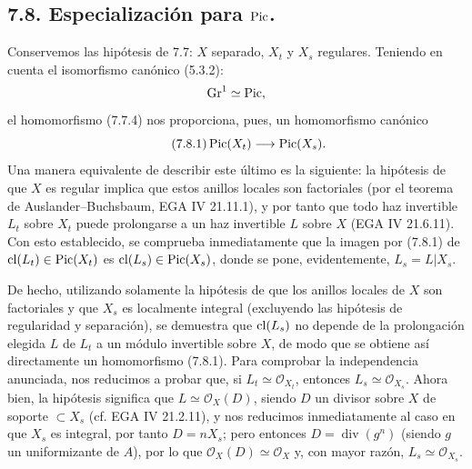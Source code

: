 \subsection*{7.8. Especialización para \(\operatorname{Pic}\).}
Conservemos las hipótesis de 7.7: \(X\) separado, \(X_t\) y \(X_s\) regulares. Teniendo en cuenta el isomorfismo canónico (5.3.2):
\[
  \operatorname{Gr}^1\simeq \operatorname{Pic} ,
\]
el homomorfismo (7.7.4) nos proporciona, pues, un homomorfismo canónico
\begin{equation}\tag{7.8.1}
  \operatorname{Pic}(X_t)\longrightarrow \operatorname{Pic}(X_s).
\end{equation}
Una manera equivalente de describir este último es la siguiente: la hipótesis de que \(X\) es regular implica que estos anillos locales son factoriales (por el teorema de Auslander--Buchsbaum, EGA IV 21.11.1), y por tanto que todo haz invertible \(L_t\) sobre \(X_t\) puede prolongarse a un haz invertible \(L\) sobre \(X\) (EGA IV 21.6.11). Con esto establecido, se comprueba inmediatamente que la imagen por (7.8.1) de \(\operatorname{cl}(L_t)\in\operatorname{Pic}(X_t)\) es \(\operatorname{cl}(L_s)\in\operatorname{Pic}(X_s)\), donde se pone, evidentemente, \(L_s=L|X_s\).

De hecho, utilizando solamente la hipótesis de que los anillos locales de \(X\) son factoriales y que \(X_s\) es localmente integral (excluyendo las hipótesis de regularidad y separación), se demuestra que \(\operatorname{cl}(L_s)\) no depende de la prolongación elegida \(L\) de \(L_t\) a un módulo invertible sobre \(X\), de modo que se obtiene así directamente un homomorfismo (7.8.1). Para comprobar la independencia anunciada, nos reducimos a probar que, si \(L_t\simeq\mathcal O_{X_t}\), entonces \(L_s\simeq\mathcal O_{X_s}\). Ahora bien, la hipótesis significa que \(L\simeq\mathcal O_X(D)\), siendo \(D\) un divisor sobre \(X\) de soporte \(\subset X_s\) (cf. EGA IV 21.2.11), y nos reducimos inmediatamente al caso en que \(X_s\) es integral, por tanto \(D=nX_s\); pero entonces \(D=\operatorname{div}(g^n)\) (siendo \(g\) un uniformizante de \(A\)), por lo que \(\mathcal O_X(D)\simeq\mathcal O_X\) y, con mayor razón, \(L_s\simeq\mathcal O_{X_s}\).

